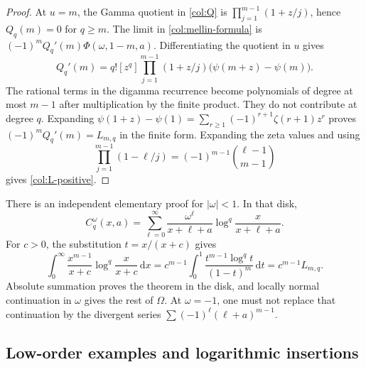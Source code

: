 \documentclass[11pt,a4paper]{article}
\numberwithin{equation}{section}
\theoremstyle{definition}
\theoremstyle{remark}
\newcommand{\dd}{\,\mathrm d}
\begin{document}
\begin{proof}
At $u=m$, the Gamma quotient in \eqref{col:Q} is
$\prod_{j=1}^{m-1}(1+z/j)$, hence $Q_q(m)=0$ for $q\ge m$.
The limit in \eqref{col:mellin-formula} is
$(-1)^m Q_q'(m)\Phi(\omega,1-m,a)$.
Differentiating the quotient in $u$ gives
\[
 Q_q'(m)=q![z^q]\prod_{j=1}^{m-1}(1+z/j)
                      \bigl(\psi(m+z)-\psi(m)\bigr).
\]
The rational terms in the digamma recurrence become polynomials
of degree at most $m-1$ after multiplication by the finite product.
They do not contribute at degree $q$. Expanding
$\psi(1+z)-\psi(1)=\sum_{r\ge1}(-1)^{r+1}\zeta(r+1)z^r$
proves $(-1)^mQ_q'(m)=L_{m,q}$ in the finite form.
Expanding the zeta values and using
\[
 \prod_{j=1}^{m-1}(1-\ell/j)
       =(-1)^{m-1}\binom{\ell-1}{m-1}
\]
gives \eqref{col:L-positive}.
\end{proof}

There is an independent elementary proof for $|\omega|<1$.
In that disk,
\begin{equation}\label{col:elementary-series}
 C_q^\omega(x,a)=\sum_{\ell=0}^\infty
  \frac{\omega^\ell}{x+\ell+a}
           \log^q\!\frac{x}{x+\ell+a}.
\end{equation}
For $c>0$, the substitution $t=x/(x+c)$ gives
\begin{equation}\label{col:elementary-moment}
 \int_0^\infty\frac{x^{m-1}}{x+c}
                  \log^q\!\frac{x}{x+c}\dd x
 =c^{m-1}\int_0^1\frac{t^{m-1}\log^q t}{(1-t)^m}\dd t
 =c^{m-1}L_{m,q}.
\end{equation}
Absolute summation proves the theorem in the disk, and locally normal
continuation in $\omega$ gives the rest of $\Omega$. At $\omega=-1$,
one must not replace that continuation by the divergent series
$\sum(-1)^\ell(\ell+a)^{m-1}$.

\subsection{Low-order examples and logarithmic insertions}
\end{document}
